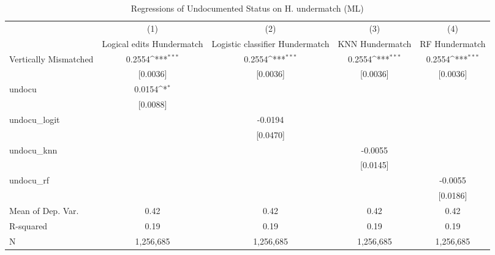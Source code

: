 \begin{table}[htbp]\centering
\def\sym#1{\ifmmode^{#1}\else\(^{#1}\)\fi}
\caption{Regressions of Undocumented Status on H. undermatch (ML)}
\begin{tabular}{l*{4}{c}}
\toprule
                    &\multicolumn{1}{c}{(1)}         &\multicolumn{1}{c}{(2)}         &\multicolumn{1}{c}{(3)}         &\multicolumn{1}{c}{(4)}         \\
                    &Logical edits Hundermatch         &Logistic classifier Hundermatch         &KNN Hundermatch         &RF Hundermatch         \\
\midrule
Vertically Mismatched&      0.2554\sym{***}&      0.2554\sym{***}&      0.2554\sym{***}&      0.2554\sym{***}\\
                    &    [0.0036]         &    [0.0036]         &    [0.0036]         &    [0.0036]         \\
\addlinespace
undocu              &      0.0154\sym{*}  &                     &                     &                     \\
                    &    [0.0088]         &                     &                     &                     \\
\addlinespace
undocu\_logit        &                     &     -0.0194         &                     &                     \\
                    &                     &    [0.0470]         &                     &                     \\
\addlinespace
undocu\_knn          &                     &                     &     -0.0055         &                     \\
                    &                     &                     &    [0.0145]         &                     \\
\addlinespace
undocu\_rf           &                     &                     &                     &     -0.0055         \\
                    &                     &                     &                     &    [0.0186]         \\
\midrule
Mean of Dep. Var.   &        0.42         &        0.42         &        0.42         &        0.42         \\
R-squared           &        0.19         &        0.19         &        0.19         &        0.19         \\
N                   &   1,256,685         &   1,256,685         &   1,256,685         &   1,256,685         \\

\end{tabular}
\end{table}
